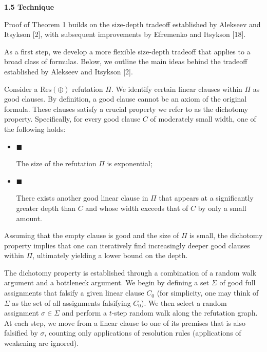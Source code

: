 \documentclass[10pt,a4paper]{article}
\begin{document}
\par\medskip\noindent\textbf{
1.5 Technique}\par


Proof of Theorem 1 builds on the size-depth tradeoff established
by Alekseev and Itsykson [2], with subsequent improvements by
Efremenko and Itsykson [18].\par



As a first step, we develop a more flexible size-depth tradeoff that applies to a broad
class of formulas.
Below, we outline the main ideas behind the tradeoff established by Alekseev and
Itsykson [2].\par



Consider a $\mathrm{Res}(\oplus)$ refutation $\Pi$.
We identify certain linear clauses within $\Pi$ as good clauses.
By definition, a good clause cannot be an axiom of the original formula.
These clauses satisfy a crucial property we refer to as the dichotomy property.
Specifically, for every good clause $C$ of moderately small width, one of the following holds:\par


\begin{itemize}


\item 
$\blacksquare$ 


The size of the refutation $\Pi$ is exponential;\par





\item 
$\blacksquare$ 


There exists another good linear clause in $\Pi$ that
appears at a significantly greater depth than $C$ and whose width exceeds that of
$C$ by only a small amount.\par





\end{itemize}



Assuming that the empty clause is good and the size of $\Pi$ is small, the dichotomy property implies that one can iteratively find increasingly deeper good clauses within $\Pi$, ultimately yielding a lower bound on the depth.\par



The dichotomy property is established through a combination of a random walk argument and a bottleneck argument. We begin by defining a set $\Sigma$ of good full assignments that falsify a given linear clause $C_{0}$ (for simplicity, one may think of $\Sigma$ as the set of all assignments falsifying $C_{0}$). We then select a random assignment $\sigma\in\Sigma$ and perform a $t$-step random walk along the refutation graph. At each step, we move from a linear clause to one of its premises that is also falsified by $\sigma$, counting only applications of resolution rules (applications of weakening are ignored).\par
\end{document}
